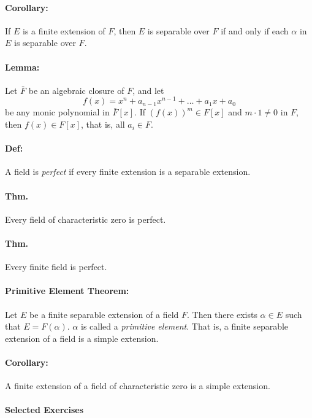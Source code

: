 \documentclass[10pt,a4paper]{article}
\begin{document}
\paragraph{Corollary:} If $E$ is a finite extension of $F$, then $E$ is separable over $F$ if and only if each $\alpha$ in $E$ is separable over $F$. 

\paragraph{Lemma:} Let $\bar{F}$ be an algebraic closure of $F$, and let
$$ f(x) = x^n+a_{n-1}x^{n-1}+ \dots + a_1x + a_0$$
be any monic polynomial in $\bar{F}[x]$. If $(f(x))^m \in F[x]$ and $m \cdot 1 \neq 0$ in $F$, then $f(x) \in F[x]$, that is, all $a_i \in F$.

\paragraph{Def:} A field is \textit{perfect} if every finite extension is a separable extension.

\paragraph{Thm.} Every field of characteristic zero is perfect.

\paragraph{Thm.} Every finite field is perfect.

\paragraph{Primitive Element Theorem:} Let $E$ be a finite separable extension of a field $F$. Then there exists $\alpha \in E$ such that $E = F(\alpha)$. $\alpha$ is called a \textit{primitive element}. That is, a finite separable extension of a field is a simple extension.

\paragraph{Corollary:} A finite extension of a field of characteristic zero is a simple extension.

\paragraph{Selected Exercises}
\end{document}
